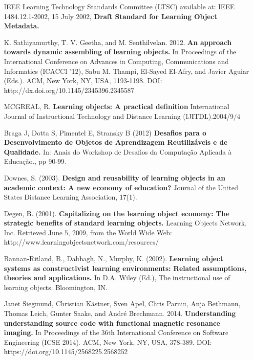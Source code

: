 \documentclass[12pt,openright,oneside,a4paper,english,french,spanish,brazil]{unifil}
\begin{document}
\begin{thebibliography}{99}

{IEEE Learning Technology Standards Committee (LTSC) available at: IEEE 1484.12.1-2002, 15 July 2002, \textbf{Draft Standard for Learning Object Metadata.}}

{K. Sathiyamurthy, T. V. Geetha, and M. Senthilvelan. 2012. \textbf{An approach towards dynamic assembling of learning objects.} In Proceedings of the International Conference on Advances in Computing, Communications and Informatics (ICACCI '12), Sabu M. Thampi, El-Sayed El-Afry, and Javier Aguiar (Eds.). ACM, New York, NY, USA, 1193-1198. DOI: http://dx.doi.org/10.1145/2345396.2345587}

{MCGREAL, R. \textbf{Learning objects: A practical definition} International Journal of Instructional Technology and Distance Learning (IJITDL).2004/9/4}

{Braga J, Dotta S, Pimentel E, Stransky B (2012) \textbf{Desafios para o
Desenvolvimento de Objetos de Aprendizagem Reutilizáveis e de Qualidade.} In: Anais do Workshop de Desafios da Computação Aplicada à Educação., pp 90-99.}

{Downes, S. (2003). \textbf{Design and reusability of learning objects in an academic context: A new economy of education?} Journal of the United States Distance Learning Association, 17(1).}

{Degen, B. (2001). \textbf{Capitalizing on the learning object economy: The strategic benefits of standard learning objects.} Learning Objects Network, Inc. Retrieved June 5, 2009, from the World Wide Web:
http://www.learningobjectsnetwork.com/resources/}

{Bannan-Ritland, B., Dabbagh, N., Murphy, K. (2002). \textbf{Learning object systems as constructivist learning environments: Related assumptions, theories and applications.} In D.A. Wiley (Ed.), The instructional
use of learning objects. Bloomington, IN.}

{Janet Siegmund, Christian Kästner, Sven Apel, Chris Parnin, Anja Bethmann, Thomas Leich, Gunter Saake, and André Brechmann. 2014. \textbf{Understanding understanding source code with functional magnetic resonance imaging.} In Proceedings of the 36th International Conference on Software Engineering (ICSE 2014). ACM, New York, NY, USA, 378-389. DOI: https://doi.org/10.1145/2568225.2568252}

\end{thebibliography}
\end{document}
